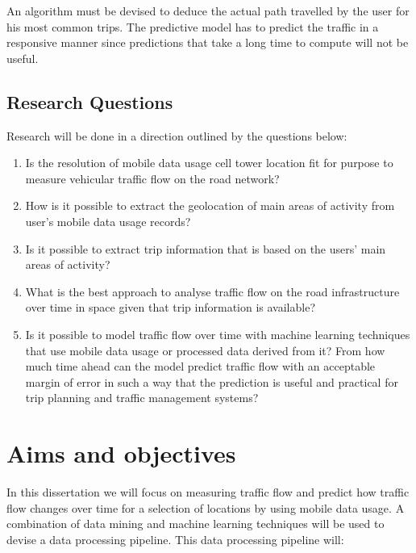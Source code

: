 \documentclass[12pt, a4paper]{report}
\theoremstyle{definition}
\theoremstyle{definition}%
\theoremstyle{definition}%
\theoremstyle{definition}%
\theoremstyle{definition}%
\theoremstyle{definition}%
\begin{document}
An algorithm must be devised to deduce the actual path travelled by the user for his most common trips. The predictive model has to predict the traffic in a responsive manner since predictions that take a long time to compute will not be useful.


\subsection{Research Questions}

Research will be done in a direction outlined by the questions below:
\begin{enumerate}
	\item Is the resolution of mobile data usage cell tower location fit for purpose to measure vehicular traffic flow on the road network?
	
	\item How is it possible to extract the geolocation of main areas of activity from user's mobile data usage records?
	
	\item Is it possible to extract trip information that is based on the users' main areas of activity?
	
	\item What is the best approach to analyse traffic flow on the road infrastructure over time in space given that trip information is available? 

	\item Is it possible to model traffic flow over time with machine learning techniques that use mobile data usage or processed data derived from it? From how much time ahead can the model predict traffic flow with an acceptable margin of error in such a way that the prediction is useful and practical for trip planning and traffic management systems?
\end{enumerate}




\section{Aims and objectives} \label{section:introduction:aims_objectives}

In this dissertation we will focus on measuring traffic flow and predict how traffic flow changes over time for a selection of locations by using mobile data usage. A combination of data mining and machine learning techniques will be used to devise a data processing pipeline. This data processing pipeline will:
\end{document}
